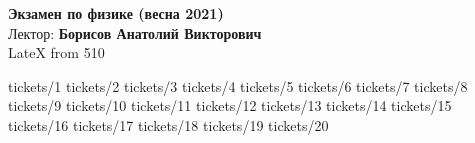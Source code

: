 \documentclass[specialist, subf, href, colorlinks=true, 12pt, times, mtpro, final]{disser}
\begin{document}
\begin{center}
{\Large \bf Экзамен по физике (весна 2021)}\\
Лектор: {\bf Борисов Анатолий Викторович}\\
LateX from 510
\end{center}
\tableofcontents

 {tickets/1}
 {tickets/2}
 {tickets/3}
 {tickets/4}
 {tickets/5}
 {tickets/6}
 {tickets/7}
 {tickets/8}
 {tickets/9}
 {tickets/10}
 {tickets/11}
 {tickets/12}
 {tickets/13}
 {tickets/14}
 {tickets/15}
 {tickets/16}
 {tickets/17}
 {tickets/18}
 {tickets/19}
 {tickets/20}
\end{document}
